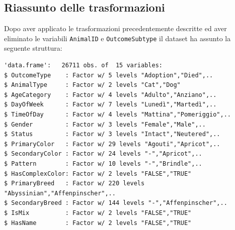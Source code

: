 \subsection{Riassunto delle trasformazioni}

Dopo aver applicato le trasformazioni precedentemente descritte ed aver eliminato le variabili \texttt{AnimalID} e \texttt{OutcomeSubtype} il dataset ha assunto la seguente struttura:

\begin{verbatim}
'data.frame':	26711 obs. of  15 variables:
$ OutcomeType    : Factor w/ 5 levels "Adoption","Died",..
$ AnimalType     : Factor w/ 2 levels "Cat","Dog"
$ AgeCategory    : Factor w/ 4 levels "Adulto","Anziano",..
$ DayOfWeek      : Factor w/ 7 levels "Lunedì","Martedì",..
$ TimeOfDay      : Factor w/ 4 levels "Mattina","Pomeriggio",..
$ Gender         : Factor w/ 3 levels "Female","Male",..
$ Status         : Factor w/ 3 levels "Intact","Neutered",..
$ PrimaryColor   : Factor w/ 29 levels "Agouti","Apricot",..
$ SecondaryColor : Factor w/ 24 levels "-","Apricot",..
$ Pattern        : Factor w/ 10 levels "-","Brindle",..
$ HasComplexColor: Factor w/ 2 levels "FALSE","TRUE"
$ PrimaryBreed   : Factor w/ 220 levels "Abyssinian","Affenpinscher",..
$ SecondaryBreed : Factor w/ 144 levels "-","Affenpinscher",..
$ IsMix          : Factor w/ 2 levels "FALSE","TRUE"
$ HasName        : Factor w/ 2 levels "FALSE","TRUE"
\end{verbatim}